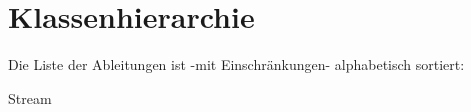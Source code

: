 \section{Klassenhierarchie}
Die Liste der Ableitungen ist -\/mit Einschränkungen-\/ alphabetisch sortiert\+:\begin{DoxyCompactList}
\item Stream\begin{DoxyCompactList}
\item {}
\end{DoxyCompactList}
\end{DoxyCompactList}
